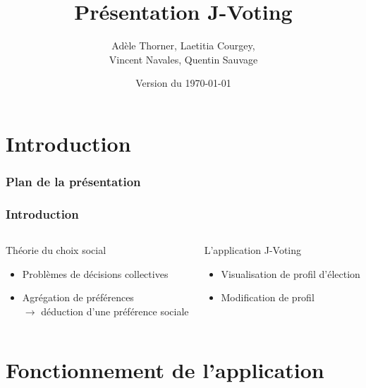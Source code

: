 \documentclass[english, french]{beamer}
\title{Présentation J-Voting}
\subtitle{}
\author{Adèle Thorner, Laetitia Courgey, \\Vincent Navales, Quentin Sauvage}
\institute{L3 MIAGE Apprentissage, Université Paris-Dauphine}
\date{Version du \today}
\begin{document}


\begin{frame}[plain]
   \titlepage
\end{frame}
\addtocounter{framenumber}{-1}

\section{Introduction}
\begin{frame}
	\frametitle{Plan de la présentation}
	\tableofcontents
\end{frame}

\begin{frame}
    \frametitle{Introduction}
    \begin{columns}
        \begin{column}{0.5\textwidth}
            {\Large Théorie du choix social}
            \begin{itemize}
                \item Problèmes de décisions collectives
                \item Agrégation de préférences\\ $\rightarrow$ déduction d'une préférence sociale
            \end{itemize}
        \end{column}
        
        \pause
        \begin{column}{0.5\textwidth}
            {\Large L'application J-Voting}
            \begin{itemize}
                \item Visualisation de profil d'élection
                \item Modification de profil
            \end{itemize}
        \end{column}
    \end{columns}
\end{frame}

\section{Fonctionnement de l'application}
\end{document}

